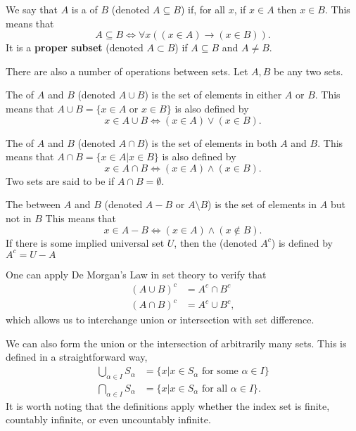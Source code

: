 \begin{definition}
We say that $A$ is a  of $B$ (denoted $A\subseteq B$) if, for all $x$, if $x\in A$ then $x\in B$.
This means that
\[ A\subseteq B  \Leftrightarrow \forall x \left( (x\in A)\rightarrow (x\in B) \right). \]
It is a \textbf{proper subset} (denoted $A\subset B$) if $A\subseteq B$ and $A\neq B$.
\end{definition}

There are also a number of operations between sets.
Let $A,B$ be any two sets.
\begin{definition}
The  of $A$ and $B$ (denoted $A\cup B$) is the set of elements in either $A$ or $B$.
This means that $A \cup B = \{ x\in A \textrm{ or } x\in B \}$ is also defined by
\[ x\in A\cup B \Leftrightarrow (x\in A)\vee (x\in B). \]
\end{definition}

\begin{definition}
The  of $A$ and $B$ (denoted $A\cap B$) is the set of elements in both $A$ and $B$.
This means that $A\cap B = \{x\in A | x\in B \}$ is also defined by
\[ x\in A\cap B \Leftrightarrow (x\in A)\wedge (x\in B). \]
Two sets are said to be  if $A\cap B = \emptyset$.
\end{definition}

\begin{definition}
The  between $A$ and $B$ (denoted $A-B$ or $A \setminus \!B$) is the set of elements in $A$ but not in $B$
This means that
\[ x\in A-B \Leftrightarrow (x\in A)\wedge (x\notin B). \]
If there is some implied universal set $U$, then the  (denoted $A^c$) is defined by $A^c = U-A$
\end{definition}

One can apply De Morgan's Law in set theory to verify that
\begin{align*}
(A \cup B)^c & = A^c \cap B^c \\
(A \cap B)^c & = A^c \cup B^c,
\end{align*}
which allows us to interchange union or intersection with set difference.

We can also form the union or the intersection of arbitrarily many sets.
This is defined in a straightforward way,
\begin{align*}
\bigcup_{\alpha \in I} S_{\alpha}
&= \{ x | x \in S_{\alpha} \text{ for some } \alpha \in I \} \\
\bigcap_{\alpha \in I} S_{\alpha}
&= \{ x | x \in S_{\alpha} \text{ for all } \alpha \in I \} .
\end{align*}
It is worth noting that the definitions apply whether the index set is finite, countably infinite, or even uncountably infinite.


